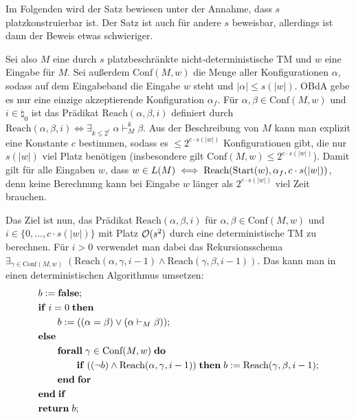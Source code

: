 \begin{Beweis}
    Im Folgenden wird der Satz bewiesen unter der Annahme, dass $s$ platzkonstruierbar ist.
    Der Satz ist auch für andere $s$ beweisbar, allerdings ist dann der Beweis etwas schwieriger.
    
    Sei also $M$ eine durch $s$ platzbeschränkte nicht-deterministische TM und $w$ eine Eingabe
    für $M$.
    Sei außerdem $\text{Conf}(M, w)$ die Menge aller Konfigurationen $\alpha$, sodass
    auf dem Eingabeband die Eingabe $w$ steht und $|\alpha| \le s(|w|)$.
    OBdA gebe es nur eine einzige akzeptierende Konfiguration $\alpha_f$.
    Für $\alpha, \beta \in \text{Conf}(M, w)$ und $i \in \natural_0$ ist das Prädikat
    $\text{Reach}(\alpha, \beta, i)$ definiert durch
    $\text{Reach}(\alpha, \beta, i) \iff \exists_{k \le 2^i}\; \alpha \vdash_M^k \beta$.
    Aus der Beschreibung von $M$ kann man explizit eine Konstante $c$ bestimmen, sodass
    es $\le 2^{c \cdot s(|w|)}$ Konfigurationen gibt, die nur $s(|w|)$ viel Platz benötigen
    (insbesondere gilt $\text{Conf}(M, w) \le 2^{c \cdot s(|w|)}$).
    Damit gilt für alle Eingaben $w$, dass
    $w \in L(M) \iff \text{Reach}(\text{Start}(w), \alpha_f, c \cdot s(|w|))$, denn
    keine Berechnung kann bei Eingabe $w$ länger als $2^{c \cdot s(|w|)}$ viel Zeit brauchen.
    
    Das Ziel ist nun, das Prädikat $\text{Reach}(\alpha, \beta, i)$ für
    $\alpha, \beta \in \text{Conf}(M, w)$ und $i \in \{0, \dotsc, c \cdot s(|w|)\}$ mit
    Platz $\mathcal{O}(s^2)$ durch eine deterministische TM zu berechnen.
    Für $i > 0$ verwendet man dabei das Rekursionsschema
    $\exists_{\gamma \in \text{Conf}(M, w)}\; (\text{Reach}(\alpha, \gamma, i - 1) \land
    \text{Reach}(\gamma, \beta, i - 1))$.
    Das kann man in einen deterministischen Algorithmus umsetzen:
    \begin{align*}&
        b := \mathbf{false};\\&
        \mathbf{if}\; i = 0 \;\mathbf{then}\;\\&
        \qquad b := ((\alpha = \beta) \lor (\alpha \vdash_M \beta));\\&
        \mathbf{else}\;\\&
        \qquad \mathbf{forall}\; \gamma \in \text{Conf}(M, w) \;\mathbf{do}\;\\&
        \qquad \qquad \mathbf{if}\; ((\lnot b) \land \text{Reach}(\alpha, \gamma, i - 1)) \;\mathbf{then}\;
        b := \text{Reach}(\gamma, \beta, i - 1);\\&
        \qquad \mathbf{end}\;\mathbf{for}\;\\&
        \mathbf{end}\;\mathbf{if}\;\\&
        \mathbf{return}\; b;
    \end{align*}
    

\end{Beweis}
